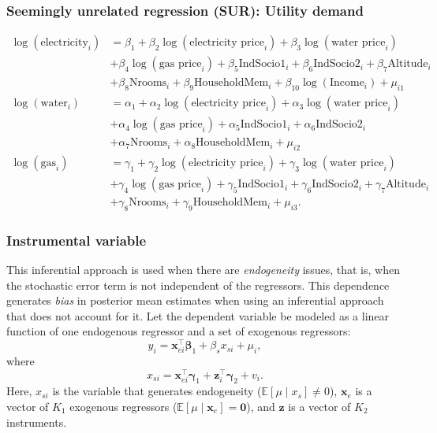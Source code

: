 \documentclass[12pt, compress]{beamer}
\begin{document}
\begin{frame}
	\frametitle{Seemingly unrelated regression (SUR): Utility demand}
{\scriptsize{
\begin{align*}
	\log(\text{electricity}_i) & = \beta_1 + \beta_2\log(\text{electricity price}_i)+\beta_3\log(\text{water price}_i)\\
	&+\beta_4\log(\text{gas price}_i)+\beta_5\text{IndSocio1}_i+\beta_6\text{IndSocio2}_i+\beta_7\text{Altitude}_i\\
	&+\beta_8\text{Nrooms}_i+\beta_9\text{HouseholdMem}_i+\beta_{10}\log(\text{Income}_i)+\mu_{i1}\\
	\log(\text{water}_i) & = \alpha_1 + \alpha_2\log(\text{electricity price}_i)+\alpha_3\log(\text{water price}_i)\\
	&+\alpha_4\log(\text{gas price}_i)+\alpha_5\text{IndSocio1}_i+\alpha_6\text{IndSocio2}_i\\
	&+\alpha_7\text{Nrooms}_i+\alpha_8\text{HouseholdMem}_i+\mu_{i2}\\
	\log(\text{gas}_i) & = \gamma_1 + \gamma_2\log(\text{electricity price}_i)+\gamma_3\log(\text{water price}_i)\\
	&+\gamma_4\log(\text{gas price}_i)+\gamma_5\text{IndSocio1}_i+\gamma_6\text{IndSocio2}_i+\gamma_7\text{Altitude}_i\\
	&+\gamma_8\text{Nrooms}_i+\gamma_9\text{HouseholdMem}_i+\mu_{i3}.
\end{align*} 
}}
\end{frame}

\begin{frame}
	\frametitle{Instrumental variable}
This inferential approach is used when there are \textit{endogeneity} issues, that is, when the stochastic error term is not independent of the regressors. This dependence generates \textit{bias} in posterior mean estimates when using an inferential approach that does not account for it.
Let the dependent variable be modeled as a linear function of one endogenous regressor and a set of exogenous regressors:
\[
y_{i} = \bm{x}_{ei}^{\top}\bm{\beta}_1 + \beta_s x_{si} + \mu_{i},
\]
where
\[
x_{si} = \bm{x}_{ei}^{\top}\bm{\gamma}_1 + \bm{z}_i^{\top}\bm{\gamma}_2 + v_{i}.
\]
Here, \(x_{si}\) is the variable that generates endogeneity (\(\mathbb{E}[\mu \mid x_s] \neq 0\)), \(\bm{x}_e\) is a vector of \(K_1\) exogenous regressors (\(\mathbb{E}[\mu \mid \bm{x}_e] = \bm{0}\)), and \(\bm{z}\) is a vector of \(K_2\) instruments.
\end{frame}
\end{document}
